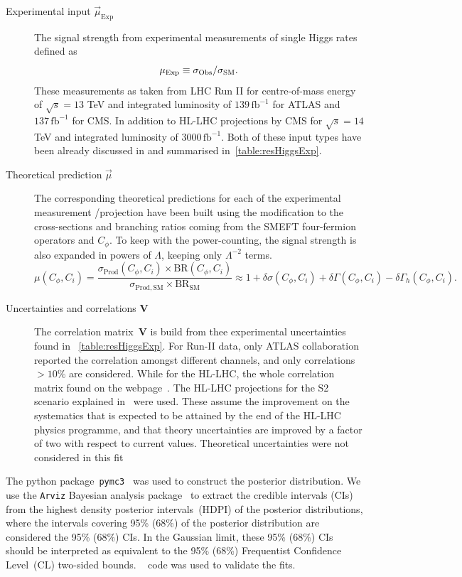 \begin{description}
	\item[Experimental input $\vec{\mu}_{\mathrm{Exp}}$ ] The signal strength from experimental measurements of single Higgs rates defined as
	\begin{equation}
		\mu_{\mathrm{Exp}}\equiv \sigma_{\mathrm{Obs}}/\sigma_{\mathrm{SM}}.
	\end{equation}
These measurements as taken from LHC Run II for centre-of-mass energy of $\sqrt{s} = 13$ TeV and  integrated luminosity of $ 139\, \mathrm{fb}^{-1}$ for ATLAS and  $ 137\,\mathrm{fb}^{-1}$ for CMS. In addition to HL-LHC projections by CMS for $\sqrt{s} = 14$ TeV and  integrated luminosity of $ 3000\, \mathrm{fb}^{-1}$. Both of these input types have been already discussed in  and summarised in~\autoref{table:resHiggsExp}.
\item [Theoretical prediction $\vec{\mu}$ ]  The corresponding theoretical predictions for each of the experimental measurement /projection have been built using the modification to the cross-sections and branching ratios coming from the SMEFT four-fermion operators and $C_\phi$. To keep with the power-counting, the signal strength is also expanded in powers of $\Lambda$, keeping only $ \Lambda^{-2}$ terms. 
\begin{equation}
	\mu(C_\phi,C_i)=\frac{\sigma_\mathrm{ Prod}(C_\phi,C_i) \times \mathrm{ BR}(C_\phi,C_i)}{\sigma_\mathrm{ Prod, SM}\times \mathrm{BR}_\mathrm{ SM}} \approx 1+\delta \sigma(C_\phi,C_i)+\delta\Gamma(C_\phi,C_i)-\delta \Gamma_h(C_\phi,C_i).
	\label{linear-mu}
\end{equation}
\item [Uncertainties and correlations $\mathbf{V}$ ]  The correlation matrix~$\mathbf{V}$ is build from thee experimental uncertainties found in ~\autoref{table:resHiggsExp}. For Run-II data, only ATLAS collaboration reported the correlation amongst different channels, and only correlations $> 10\%$ are considered. While for the HL-LHC, the whole correlation matrix found on the webpage~\cite{twiki}.  The HL-LHC projections for the S2 scenario explained in~\cite{Cepeda:2019klc} were used. These assume the improvement on the systematics that is expected to be attained by the end of the HL-LHC physics programme, and that theory uncertainties are improved by a factor of two with respect to current values. Theoretical uncertainties were not considered in this fit
\end{description}
The python package~\texttt{pymc3}~\cite{Salvatier2016} was used to construct the posterior distribution. We use the \texttt{Arviz} Bayesian analysis package~\cite{arviz_2019} to extract the credible intervals (CIs) from the highest density posterior intervals~(HDPI) of the posterior distributions, where the intervals covering 95\% (68\%) of the posterior distribution are considered the 95\% (68\%) CIs. In the Gaussian limit, these  95\% (68\%) CIs should be interpreted as equivalent to the 95\%  (68\%) Frequentist  Confidence Level~(CL) two-sided bounds. \HEPfit~\cite{deBlas:2019okz} code was used to validate the fits.
